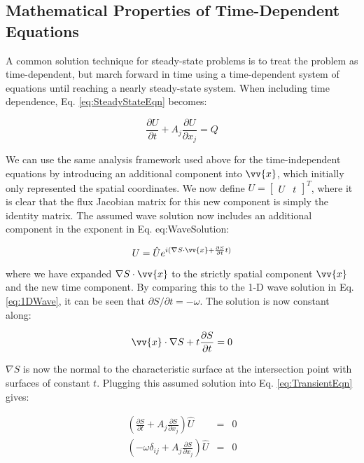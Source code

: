 \documentclass[10pt]{article}
\newcommand{\beq}{\begin{equation}}
\newcommand{\eeq}{\end{equation}}
\begin{document}
\begin{flushleft}
\subsection{Mathematical Properties of Time-Dependent Equations}

A common solution technique for steady-state problems is to treat the problem as time-dependent, but march forward in time using a time-dependent system of equations until reaching a nearly steady-state system. When including time dependence, Eq. \eqref{eq:SteadyStateEqn} becomes:

\beq
\label{eq:TransientEqn}
\frac{\partial U}{\partial t}+A_j\frac{\partial U}{\partial x_j}=Q
\eeq

We can use the same analysis framework used above for the time-independent equations by introducing an additional component into \(\vv{x}\), which initially only represented the spatial coordinates. We now define \(U=\begin{bmatrix}U & t\end{bmatrix}^T\), where it is clear that the flux Jacobian matrix for this new component is simply the identity matrix. The assumed wave solution now includes an additional component in the exponent in Eq. {eq:WaveSolution}:

\beq
U=\hat{U}e^{i(\nabla S\cdot\vv{x}+\frac{\partial S}{\partial t}t)}
\eeq

where we have expanded \(\nabla S\cdot\vv{x}\) to the strictly spatial component \(\vv{x}\) and the new time component. By comparing this to the 1-D wave solution in Eq. \eqref{eq:1DWave}, it can be seen that \(\partial S/\partial t=-\omega\). The solution is now constant along:

\beq
\label{eq:TransientConstant}
\vv{x}\cdot\nabla S+t\frac{\partial S}{\partial t}=0
\eeq

\(\nabla S\) is now the normal to the characteristic surface at the intersection point with surfaces of constant \(t\). Plugging this assumed solution into Eq. \eqref{eq:TransientEqn} gives:

\begin{subequations}
\begin{eqnarray}
\left(\frac{\partial S}{\partial t}+A_j\frac{\partial S}{\partial x_j}\right)\hat{U}&=&0\\
\left(-\omega\delta_{ij}+A_j\frac{\partial S}{\partial x_j}\right)\hat{U}&=&0
\end{eqnarray}
\end{subequations}


\end{flushleft}
\end{document}
